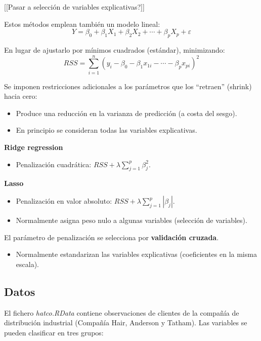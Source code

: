 \documentclass[]{book}
\providecommand{\tightlist}{%
  \setlength{\itemsep}{0pt}\setlength{\parskip}{0pt}}
\begin{document}
{[}{[}Pasar a selección de variables explicativas?{]}{]}

Estos métodos emplean también un modelo lineal:
\[Y=\beta_{0}+\beta_{1}X_{1}+\beta_{2}X_{2}+\cdots+\beta_{p}X_{p}+\varepsilon\]

En lugar de ajustarlo por mínimos cuadrados (estándar), minimizando:
\[ RSS = \sum\limits_{i=1}^{n}\left(  y_{i} - \beta_0 - \beta_1 x_{1i} - \cdots - \beta_p x_{pi} \right)^{2}\]

Se imponen restricciones adicionales a los parámetros que los
``retraen'' (shrink) hacia cero:

\begin{itemize}
\item
  Produce una reducción en la varianza de predicción (a costa del
  sesgo).
\item
  En principio se consideran todas las variables explicativas.
\end{itemize}

\textbf{Ridge regression}

\begin{itemize}
\tightlist
\item
  Penalización cuadrática: \(RSS+\lambda\sum_{j=1}^{p}\beta_{j}^{2}\).
\end{itemize}

\textbf{Lasso}

\begin{itemize}
\item
  Penalización en valor absoluto:
  \(RSS+\lambda\sum_{j=1}^{p}|\beta_{j}|\).
\item
  Normalmente asigna peso nulo a algunas variables (selección de
  variables).
\end{itemize}

El parámetro de penalización se selecciona por \textbf{validación
cruzada}.

\begin{itemize}
\tightlist
\item
  Normalmente estandarizan las variables explicativas (coeficientes en
  la misma escala).
\end{itemize}

\subsection{Datos}\label{datos}

El fichero \emph{hatco.RData} contiene observaciones de clientes de la
compañía de distribución industrial (Compañía Hair, Anderson y Tatham).
Las variables se pueden clasificar en tres grupos:
\end{document}
